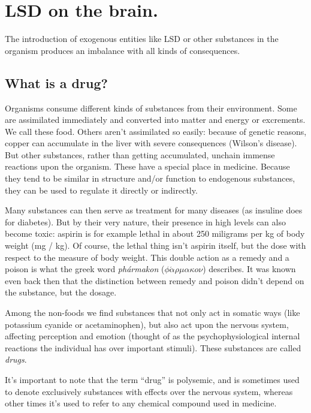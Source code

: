 \section{LSD on the brain.}

The introduction of exogenous entities like LSD or other substances in the organism produces an imbalance with all kinds of consequences.

\subsection{What is a drug?}

Organisms consume different kinds of substances from their environment. Some are assimilated immediately and converted into matter and energy or excrements. We call these food. Others aren't assimilated so easily: because of genetic reasons, copper can accumulate in the liver with severe consequences (Wilson's disease). But other substances, rather than getting accumulated, unchain immense reactions upon the organism. These have a special place in medicine. Because they tend to be similar in structure and/or function to endogenous substances, they can be used to regulate it directly or indirectly.

Many substances can then serve as treatment for many diseases (as insuline does for diabetes). But by their very nature, their presence in high levels can also become toxic: aspirin is for example lethal in about 250 miligrams per kg of body weight (mg / kg). Of course, the lethal thing isn't aspirin itself, but the dose with respect to the measure of body weight. This double action as a remedy and a poison is what the greek word \textit{phármakon} ($\phi\acute{\alpha}\rho\mu\alpha\kappa o\nu$) describes. It was known even back then that the distinction between remedy and poison didn't depend on the substance, but the dosage.

Among the non-foods we find substances that not only act in somatic ways (like potassium cyanide or acetaminophen), but also act upon the nervous system, affecting perception and emotion (thought of as the psychophysiological internal reactions the individual has over important stimuli). These substances are called \textit{drugs}.

It's important to note that the term \enquote{drug} is polysemic, and is sometimes used to denote exclusively substances with effects over the nervous system, whereas other times it's used to refer to any chemical compound used in medicine.

